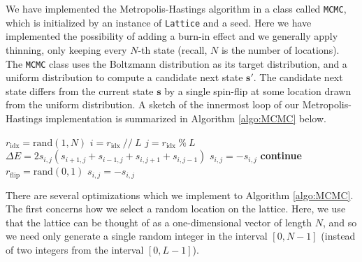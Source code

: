 \documentclass[english,notitlepage,reprint]{revtex4-2}  %
\renewcommand{\vec}[1]{\mathbf{#1}}
\begin{document}
We have implemented the Metropolis-Hastings algorithm in a class called \texttt{MCMC}, which is initialized by an instance of \texttt{Lattice} and a seed.
Here we have implemented the possibility of adding a burn-in effect and we generally apply thinning, only keeping every \(N\)-th state (recall, \(N\) is the number of locations).
The \texttt{MCMC} class uses the Boltzmann distribution as its target distribution, and a uniform distribution to compute a candidate next state \(\vec{s}'\). 
The candidate next state differs from the current state \(\vec{s}\) by a single spin-flip at some location drawn from the uniform distribution.
A sketch of the innermost loop of our Metropolis-Hastings implementation is summarized in Algorithm \ref{algo:MCMC} below. 
\begin{algorithm}[H]
    \caption{Metropolis-Hastings (2D Ising)}\label{algo:MCMC}
    \begin{algorithmic}
            \State $r_\text{idx} = \text{rand}(1, N)$
            \State $i = r_\text{idx} \ // \ L$
            \State $j = r_\text{idx} \ \% \ L$
            \newline
            \State $\Delta E = 2 s_{i,j} (s_{i+1,j} + s_{i-1,j} + s_{i,j+1} + s_{i,j-1})$
            \newline
                \State $s_{i,j} = -s_{i,j}$
                \State \textbf{continue}
            \EndIf
            \newline
            \State $r_\text{flip} = \text{rand}(0, 1)$
                \State $s_{i,j} = -s_{i,j}$
            \EndIf
        \EndFor
    \end{algorithmic}
\end{algorithm}


There are several optimizations which we implement to Algorithm \ref{algo:MCMC}. 
The first concerns how we select a random location on the lattice.
Here, we use that the lattice can be thought of as a one-dimensional vector of length \(N\), and so we need only generate a single random integer in the interval \([0,N-1]\) (instead of two integers from the interval \([0,L-1]\)).
\end{document}
